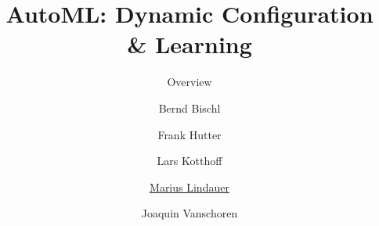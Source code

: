 




\title[AutoML: Overview]{AutoML: Dynamic Configuration \& Learning}
\subtitle{Overview}
\author[Marius Lindauer]{Bernd Bischl \and Frank Hutter \and Lars Kotthoff\newline \and \underline{Marius Lindauer} \and Joaquin Vanschoren}
\institute{}
\date{}





	
	\maketitle
	

